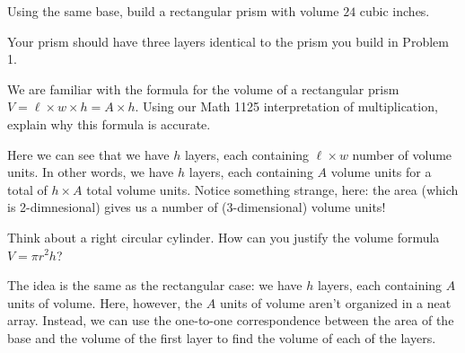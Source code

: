 \documentclass{ximera}
\begin{document}
\begin{problem}
Using the same base, build a rectangular prism with volume $24$ cubic inches.

\begin{solution}
Your prism should have three layers identical to the prism you build in Problem 1.
\end{solution}
\end{problem}


\begin{problem}
We are familiar with the formula for the volume of a rectangular prism $V = \ell \times w \times h = A \times h$.  Using our Math 1125 interpretation of multiplication, explain why this formula is accurate.

\begin{solution}
Here we can see that we have $h$ layers, each containing $\ell \times w$ number of volume units.  In other words, we have $h$ layers, each containing $A$ volume units for a total of $h \times A$ total volume units.  Notice something strange, here: the area (which is 2-dimnesional) gives us a number of (3-dimensional) volume units!
\end{solution}
\end{problem}

\begin{problem} 
Think about a right circular cylinder.  How can you justify the volume formula $V = \pi r^2 h$?

\begin{solution}
The idea is the same as the rectangular case: we have $h$ layers, each containing $A$ units of volume.  Here, however, the $A$ units of volume aren't organized in a neat array.  Instead, we can use the one-to-one correspondence between the area of the base and the volume of the first layer to find the volume of each of the layers.
\end{solution}
\end{problem}
\end{document}
